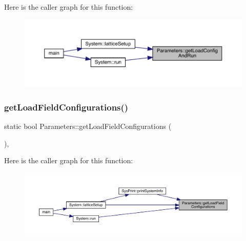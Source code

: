 Here is the caller graph for this function\+:
\nopagebreak
\begin{figure}[H]
\begin{center}
\leavevmode
\includegraphics[width=350pt]{class_parameters_a7870fae41b172caee9fa020c86d056ac_icgraph}
\end{center}
\end{figure}
\mbox{\label{class_parameters_a5a11841ee32f68ebd27a8146a3fda07b}} 
\subsubsection{\texorpdfstring{getLoadFieldConfigurations()}{getLoadFieldConfigurations()}}
{\footnotesize\ttfamily static bool Parameters\+::get\+Load\+Field\+Configurations (\begin{DoxyParamCaption}{ }\end{DoxyParamCaption})\hspace{0.3cm}{\ttfamily [inline]}, {\ttfamily [static]}}

Here is the caller graph for this function\+:
\nopagebreak
\begin{figure}[H]
\begin{center}
\leavevmode
\includegraphics[width=350pt]{class_parameters_a5a11841ee32f68ebd27a8146a3fda07b_icgraph}
\end{center}
\end{figure}
\mbox{\label{class_parameters_ae63389dad9d4564f4849137d2ab37df5}} 
